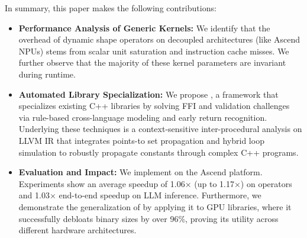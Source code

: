 In summary, this paper makes the following contributions:
\begin{itemize}
    \item \textbf{Performance Analysis of Generic Kernels:} We identify that the overhead of dynamic shape operators on decoupled architectures (like Ascend NPUs) stems from scalar unit saturation and instruction cache misses. We further observe that the majority of these kernel parameters are invariant during runtime.
    \item \textbf{Automated Library Specialization:} We propose \mysys, a framework that specializes existing C++ libraries by solving FFI and validation challenges via rule-based cross-language modeling and early return recognition. 
    Underlying these techniques is a context-sensitive inter-procedural analysis on LLVM IR that integrates points-to set propagation and hybrid loop simulation to robustly propagate constants through complex C++ programs.
    \item \textbf{Evaluation and Impact:} We implement \mysys on the Ascend platform. Experiments show an average speedup of 1.06$\times$ (up to 1.17$\times$) on operators and 1.03$\times$ end-to-end speedup on LLM inference. Furthermore, we demonstrate the generalization of \mysys by applying it to GPU libraries, where it successfully debloats binary sizes by over 96\%, proving its utility across different hardware architectures.
\end{itemize}